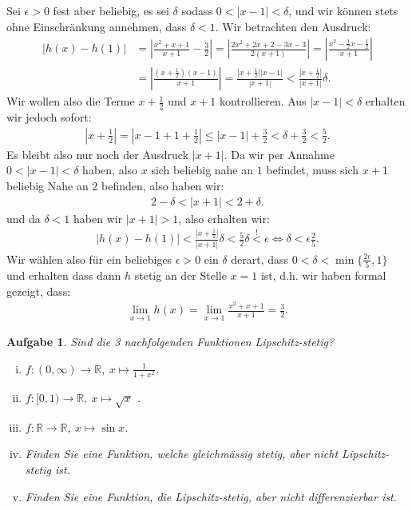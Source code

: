 \documentclass[a4paper, 20]{exam}
\newtheorem{ex}{Aufgabe}
\begin{document}
\begin{solution}
Sei $ \epsilon >0$ fest aber beliebig, es sei $\delta$ sodass $0< |x-1| < \delta$, und wir können stets ohne Einschränkung annehmen, dass $\delta < 1$. Wir betrachten den Ausdruck:
\begin{align*}
|h(x)-h(1)| &= \left| \frac{x^2 + x +1}{x+1} - \frac{3}{2} \right| = \left| \frac{2x^2+2x+2-3x-3}{2(x+1)} \right| = \left| \frac{x^2- \frac{1}{2}x- \frac{1}{2}}{x+1} \right| \\
& = \left| \frac{ \left( x + \frac{1}{2}\right) (x-1)}{x+1} \right| = \frac{ \left| x + \frac{1}{2}\right| |x-1|}{|x+1|} < \frac{\left|x + \frac{1}{2} \right|}{|x+1|} \delta.
\end{align*}
Wir wollen also die Terme $x+ \frac{1}{2}$ und $x+1$ kontrollieren. Aus $|x-1| < \delta$ erhalten wir jedoch sofort:
\begin{align*}
\left| x + \frac{1}{2} \right| = \left| x -1 +1 + \frac{1}{2} \right| \leq |x-1| + \frac{3}{2} < \delta + \frac{3}{2}< \frac{5}{2}.
\end{align*}
Es bleibt also nur noch der Ausdruck $|x+1|$. Da wir per Annahme $0 < |x-1| < \delta$ haben,  also $x$ sich beliebig nahe an $1$ befindet, muss sich $x+1$ beliebig Nahe an $2$ befinden, also haben wir:
\begin{align*}
2 -\delta < |x+1| < 2 + \delta.
\end{align*}
und da $\delta <1$ haben wir $|x+1| >1$, also erhalten wir:
\begin{align*}
|h(x)-h(1)| < \frac{\left| x + \frac{1}{2} \right|}{|x+1|} \delta < \frac{5}{2} \delta \overset{!}< \epsilon \iff \delta < \epsilon \frac{2}{5}.
\end{align*} 
Wir wählen also für ein beliebiges $\epsilon >0$ ein $\delta$ derart, dass $0 < \delta < \min \lbrace \frac{2\epsilon}{5},1 \rbrace$ und erhalten dass dann $h$ stetig an der Stelle $x=1$ ist, d.h. wir haben formal gezeigt, dass:
\begin{align*}
\lim_{x \rightarrow 1} h(x) = \lim_{x \rightarrow 1} \frac{x^2 + x+1}{x+1} = \frac{3}{2}.
\end{align*}
\end{solution}


\begin{ex} Sind die 3 nachfolgenden Funktionen Lipschitz-stetig?
\begin{enumerate}[i)]
\item $f:(0, \infty) \longrightarrow \mathbb{R}, \ x \longmapsto \frac{1}{1+x^2}$.
\item $f:[0,1) \longrightarrow \mathbb{R}, \ x \longmapsto \sqrt{x}$ .
\item $f: \mathbb{R} \longrightarrow \mathbb{R}, \ x \longmapsto \sin x$.
\item Finden Sie eine Funktion, welche gleichmässig stetig, aber nicht Lipschitz-stetig ist.
\item Finden Sie eine Funktion, die Lipschitz-stetig, aber nicht differenzierbar ist.

\end{enumerate}

\end{ex}
\end{document}
